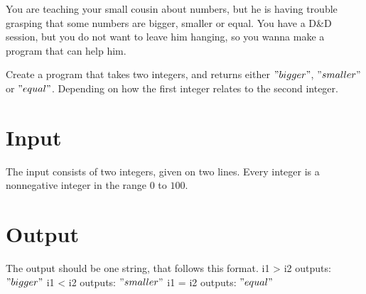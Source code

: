
You are teaching your small cousin about numbers, but he is having trouble grasping that some numbers are bigger, smaller or equal.
You have a D&D session, but you do not want to leave him hanging, so you wanna make a program that can help him. 

Create a program that takes two integers, and returns either $"bigger"$, $"smaller"$ or $"equal"$. Depending on how the first integer relates to the second integer.

\section*{Input}

The input consists of two integers, given on two lines.
Every integer is a nonnegative integer in the range $0$ to $100$.

\section*{Output}

The output should be one string, that follows this format.
i1 > i2 outputs: $"bigger"$
i1 < i2 outputs: $"smaller"$ 
i1 = i2 outputs: $"equal"$